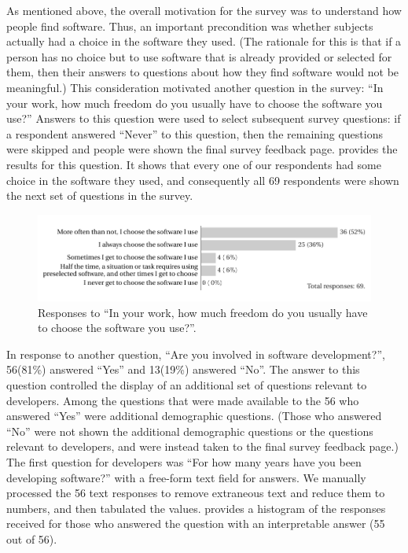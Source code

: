 \documentclass{casicswhitepaper}
\newcommand{\totalRespondents}{69\xspace}
\newcommand{\totalDevelopers}{56\xspace}
\newcommand{\totalNotDevelopers}{13\xspace}
\begin{document}
As mentioned above, the overall motivation for the survey was to understand how people find software.  Thus, an important precondition was whether subjects actually had a choice in the software they used.  (The rationale for this is that if a person has no choice but to use software that is already provided or selected for them, then their answers to questions about how they find software would not be meaningful.)  This consideration motivated another question in the survey: ``In your work, how much freedom do you usually have to choose the software you use?''   Answers to this question were used to select subsequent survey questions: if a respondent answered ``Never'' to this question, then the remaining questions were skipped and people were shown the final survey feedback page.   provides the results for this question.  It shows that every one of our respondents had some choice in the software they used, and consequently all \totalRespondents respondents were shown the next set of questions in the survey.  %

\begin{figure}[htb]
  \vspace*{1ex}
  \centering
  \includegraphics{files/plots/how-often-choose-software.pdf}
  \vspace*{-3.5ex}
  \caption{Responses to ``In your work, how much freedom do you usually have to choose the software you use?''.}
  \label{freedom}
\end{figure}

In response to another question, ``Are you involved in software development?'', \totalDevelopers (81\%) answered ``Yes'' and \totalNotDevelopers (19\%) answered ``No''.  The answer to this question controlled the display of an additional set of questions relevant to developers.  Among the questions that were made available to the \totalDevelopers who answered ``Yes'' were additional demographic questions.  (Those who answered ``No'' were not shown the additional demographic questions or the questions relevant to developers, and were instead taken to the final survey feedback page.)  The first question for developers was ``For how many years have you been developing software?'' with a free-form text field for answers.  We manually processed the \totalDevelopers text responses to remove extraneous text and reduce them to numbers, and then tabulated the values.   provides a histogram of the responses received for those who answered the question with an interpretable answer (55 out of \totalDevelopers).
\end{document}
